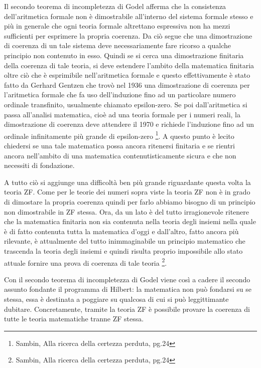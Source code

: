 Il secondo teorema di incompletezza di Godel afferma che la consistenza
dell'aritmetica formale non è dimostrabile all'interno del sistema
formale stesso e più in generale che ogni teoria formale altrettano
espressiva non ha mezzi sufficienti per esprimere la propria coerenza.
Da ciò segue che una dimostrazione di coerenza di un tale sistema
deve necessariamente fare ricorso a qualche principio non contenuto
in esso. Quindi se si cerca una dimostrazione finitaria della coerenza
di tale teoria, si deve estendere l'ambito della matematica finitaria
oltre ciò che è esprimibile nell'aritmetica formale e questo effettivamente
è stato fatto da Gerhard Gentzen che trovò nel 1936 una dimostrazione
di coerenza per l'aritmetica formale che fa uso dell'induzione fino
ad un particolare numero ordinale transfinito, usualmente chiamato
epsilon-zero. Se poi dall'aritmetica si passa all'analisi matematica,
cioè ad una teoria formale per i numeri reali, la dimostrazione di
coerenza deve attendere il 1970 e richiede l'induzione fino ad un
ordinale infinitamente più grande di epsilon-zero%
\footnote{Sambin, Alla ricerca della certezza perduta, pg.24%
}. A questo punto è lecito chiedersi se una tale matematica possa ancora
ritenersi finitaria e se rientri ancora nell'ambito di una matematica
contenutisticamente sicura e che non necessiti di fondazione.

A tutto ciò si aggiunge una difficoltà ben più grande riguardante
questa volta la teoria ZF. Come per le teorie dei numeri sopra viste
la teoria ZF non è in grado di dimostare la propria coerenza quindi
per farlo abbiamo bisogno di un principio non dimostrabile in ZF stessa.
Ora, da un lato è del tutto irragionevole ritenere che la matematica
finitaria non sia contenuta nella teoria degli insiemi nella quale
è di fatto contenuta tutta la matematica d'oggi e dall'altro, fatto
ancora più rilevante, è attualmente del tutto inimmaginabile un principio
matematico che trascenda la teoria degli insiemi e quindi risulta
proprio impossibile allo stato attuale fornire una prova di coerenza
di tale teoria%
\footnote{Sambin, Alla ricerca della certezza perduta, pg.24%
}.

Con il secondo teorema di incompletezza di Godel viene così a cadere
il secondo assunto fondante il programma di Hilbert: la matematica
non può fondarsi su se stessa, essa è destinata a poggiare su qualcosa
di cui si può leggittimante dubitare. Concretamente, tramite la teoria
ZF è possibile provare la coerenza di tutte le teoria matematiche
tranne ZF stessa.


